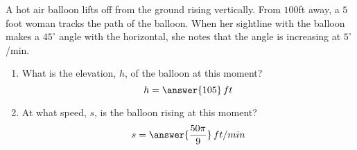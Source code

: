 \documentclass{ximera}
\author{Gregory Hartman \and Matthew Carr}
\begin{document}
\begin{exercise}




A hot air balloon lifts off from the ground rising vertically. From $100$ft away, a $5$ foot woman tracks the path of the balloon. When her sightline with the balloon makes a $45^{\circ}$ angle with the horizontal, she notes that the angle is increasing at $5^{\circ}$/min.

\begin{enumerate}
\item		What is the elevation, $h$, of the balloon at this moment? \[h=\answer{105}\,ft\]
\item		At what speed, $s$, is the balloon rising at this moment? \[s=\answer{\frac{50\pi}{9}}\,ft/min\]
\end{enumerate}


\end{exercise}
\end{document}
